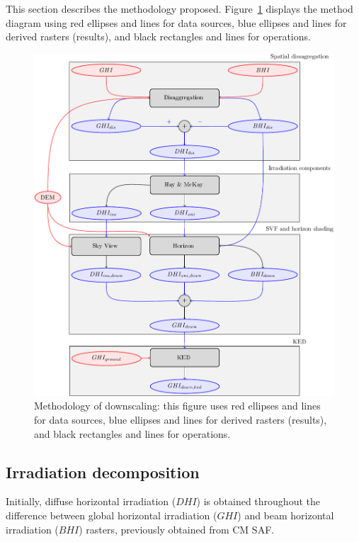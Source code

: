 \documentclass[article]{jss}
\begin{document}
This section describes the methodology
proposed. Figure~\ref{fig:method} displays the method diagram using
red ellipses and lines for data sources, blue ellipses and lines for
derived rasters (results), and black rectangles and lines for
operations.
\begin{figure}
  \centering
  \includegraphics[width=\textwidth]{figs/algorithmScheme.pdf}
  \caption{Methodology of downscaling: this figure uses red ellipses
    and lines for data sources, blue ellipses and lines for derived
    rasters (results), and black rectangles and lines for operations.
  }
  \label{fig:method}
\end{figure}


\subsection{Irradiation decomposition}
\label{sec:irradDecomp}

Initially, diffuse horizontal irradiation ($DHI$) is obtained
throughout the difference between global horizontal irradiation
($GHI$) and beam horizontal irradiation ($BHI$) rasters,
previously obtained from CM SAF.
\end{document}
